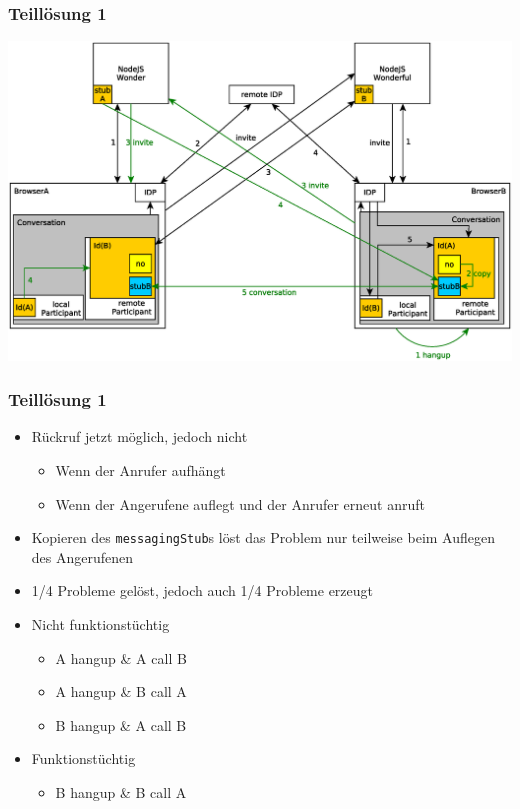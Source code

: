 \documentclass{beamer}
\begin{document}
\begin{frame}
	\frametitle{Teillösung 1}
	\includegraphics[scale=0.365,centered]{pictures/close_bye_bh_ba} %
\end{frame}

\begin{frame}[fragile]
	\frametitle{Teillösung 1}
	\begin{itemize}
		\item Rückruf jetzt möglich, jedoch nicht
		\begin{itemize}
			\item Wenn der Anrufer aufhängt
			\item Wenn der Angerufene auflegt und der Anrufer erneut anruft
		\end{itemize}
		\item Kopieren des \texttt{messagingStub}s löst das Problem nur teilweise beim Auflegen des Angerufenen
		\item 1/4 Probleme gelöst, jedoch auch 1/4 Probleme erzeugt
		\item Nicht funktionstüchtig
		\begin{itemize}
			\item A hangup \&  A call  B
			\item A hangup \&  B call  A
			\item B hangup \&  A call  B
		\end{itemize}
		\item Funktionstüchtig
		\begin{itemize}
			\item B hangup \&  B call  A
		\end{itemize}
	\end{itemize}
\end{frame}
\end{document}
